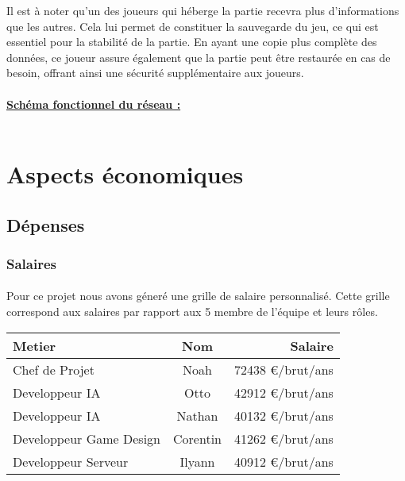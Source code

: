 \documentclass{article}
\begin{document}
Il est à noter qu'un des joueurs qui héberge la partie recevra plus d'informations que les autres. Cela lui permet de constituer la sauvegarde du jeu, ce qui est essentiel pour la stabilité de la partie. En ayant une copie plus complète des données, ce joueur assure également que la partie peut être restaurée en cas de besoin, offrant ainsi une sécurité supplémentaire aux joueurs. \\ \\
\textbf{\underline{Schéma fonctionnel du réseau :}}\\ \\
\normalsize
{}
\large
\pagebreak
\section{Aspects économiques}
\subsection{Dépenses}
\subsubsection{Salaires}
\paragraph{} Pour ce projet nous avons géneré une grille de salaire personnalisé. Cette grille correspond aux salaires par rapport aux 5 membre de l'équipe et leurs r\^oles.\\

\begin{tabular}{ | l | c | r | } \hline
   \textbf{Metier} & \textbf{Nom} & \textbf{Salaire} \\ \hline
   Chef de Projet & Noah & 72438 €/brut/ans \\ \hline
   Developpeur IA & Otto & 42912 €/brut/ans  \\ \hline
   Developpeur IA & Nathan & 40132 €/brut/ans  \\ \hline
   Developpeur Game Design & Corentin & 41262 €/brut/ans \\ \hline
   Developpeur Serveur & Ilyann & 40912 €/brut/ans \\ \hline
\end{tabular}
\end{document}
